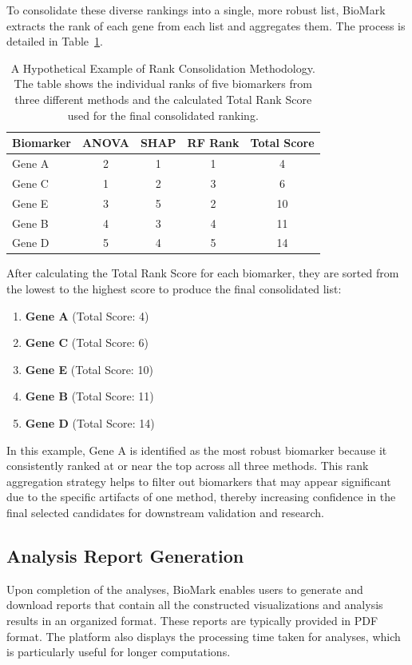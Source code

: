 \documentclass[journal]{IEEEtran}
\begin{document}
To consolidate these diverse rankings into a single, more robust list, BioMark extracts the rank of each gene from each list and aggregates them. The process is detailed in Table~\ref{tab:rank_consolidation_example}.

\begin{table}[htbp]
\centering
\caption{A Hypothetical Example of Rank Consolidation Methodology. The table shows the individual ranks of five biomarkers from three different methods and the calculated Total Rank Score used for the final consolidated ranking.}
\label{tab:rank_consolidation_example}
\begin{tabular}{lcccc}
\toprule
\textbf{Biomarker} & \textbf{ANOVA} & \textbf{SHAP} & \textbf{RF Rank} & \textbf{Total Score} \\
\midrule
Gene A & 2 & 1 & 1 & 4 \\
Gene C & 1 & 2 & 3 & 6 \\
Gene E & 3 & 5 & 2 & 10 \\
Gene B & 4 & 3 & 4 & 11 \\
Gene D & 5 & 4 & 5 & 14 \\
\bottomrule
\end{tabular}
\end{table}


After calculating the Total Rank Score for each biomarker, they are sorted from the lowest to the highest score to produce the final consolidated list:
\begin{enumerate}
\item \textbf{Gene A} (Total Score: 4)
\item \textbf{Gene C} (Total Score: 6)
\item \textbf{Gene E} (Total Score: 10)
\item \textbf{Gene B} (Total Score: 11)
\item \textbf{Gene D} (Total Score: 14)
\end{enumerate}

In this example, Gene A is identified as the most robust biomarker because it consistently ranked at or near the top across all three methods. This rank aggregation strategy helps to filter out biomarkers that may appear significant due to the specific artifacts of one method, thereby increasing confidence in the final selected candidates for downstream validation and research.

\subsection{Analysis Report Generation}
Upon completion of the analyses, BioMark enables users to generate and download reports that contain all the constructed visualizations and analysis results in an organized format. These reports are typically provided in PDF format. The platform also displays the processing time taken for analyses, which is particularly useful for longer computations.
\end{document}
